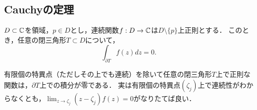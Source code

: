 \documentclass[uplatex, dvipdfmx]{jsreport}
\begin{document}
\subsection{Cauchyの定理}

\begin{lemma}[閉三角形領域に対するCauchyの定理]
    $D\subset\mathbb{C}$を領域，$p\in D$とし，連続関数$f:D\to\mathbb{C}$は$D\setminus\{p\}$上正則とする．
    このとき，任意の閉三角形$T\subset D$について，
    \[\int_{\partial T}f(z)dz=0.\]
\end{lemma}
\begin{remarks}
    有限個の特異点（ただしその上でも連続）を除いて任意の閉三角形$T$上で正則な関数は，$\partial T$上での積分が零である．
    実は有限個の特異点$(\zeta_j)$上で連続性がわからなくとも，$\lim_{z\to\zeta_j}(z-\zeta_j)f(z)=0$がなりたてば良い．
\end{remarks}
\end{document}
